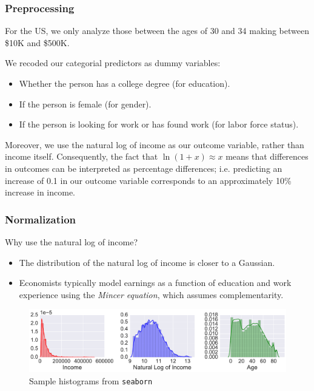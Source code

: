 \documentclass{beamer}
\let\olditem=\item
\renewcommand{\item}{\olditem \justifying}
\begin{document}
\frame %
{
  \frametitle{Preprocessing}

 For the US, we only analyze those between the ages of 30 and 34 making between \$10K and \$500K. 
 
 We recoded our categorial predictors as dummy variables: 
 \begin{itemize}
 \item Whether the person has a college degree (for education).
 \item If the person is female (for gender).
 \item If the person is looking for work or has found work (for labor force status).
 \end{itemize}
 
 Moreover, we use the natural log of income as our outcome variable, rather than income itself. Consequently, the fact that $\ln(1+x) \approx x$ means that differences in outcomes can be interpreted as percentage differences; i.e. predicting an increase of 0.1 in our outcome variable corresponds to an approximately 10\% increase in income.


}

\frame %
{
  \frametitle{Normalization}


\begin{block}{Why use the natural log of income?}
  \begin{itemize}
  \item The distribution of the natural log of income is closer to a Gaussian. 
  \item Economists typically model earnings as a function of education and work experience using the \emph{Mincer equation}, which assumes complementarity.
  \end{itemize}
  \end{block}

\begin{figure}[htbp]
\begin{center}
\includegraphics[width=\textwidth]{example_histograms.pdf}

\caption{Sample histograms from \texttt{seaborn}}
\label{histograms}
\end{center}
\end{figure}

}
\end{document}
